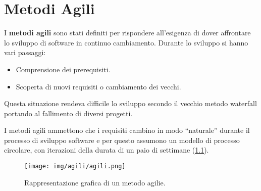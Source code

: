 \chapter{Metodi Agili}
I \textbf{metodi agili} sono stati definiti per rispondere all'esigenza di dover affrontare lo sviluppo di software in continuo cambiamento. Durante lo sviluppo si hanno vari passaggi:
\begin{itemize}
    \item Comprensione dei prerequisiti.
    \item Scoperta di nuovi requisiti o cambiamento dei vecchi.
\end{itemize}

Questa situazione rendeva difficile lo sviluppo secondo il vecchio metodo waterfall portando al fallimento di diversi progetti.

I metodi agili ammettono che i requisiti cambino in modo “naturale” durante il processo di sviluppo software e per questo assumono un modello di processo circolare, con iterazioni della durata di un paio di settimane (\ref{fig:agili}).

\begin{figure}[!ht]
    \centering
    \texttt{[image: img/agili/agili.png]}
    \caption{Rappresentazione grafica di un metodo agilie.}
    \label{fig:agili}
\end{figure}

